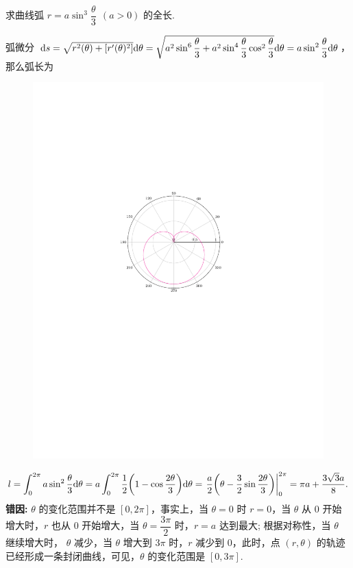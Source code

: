 \begin{example}
    求曲线弧 $r=a\sin^3\dfrac{\theta}{3}~~(a>0)$ 的全长.
\end{example}
\begin{errorSolution}
    弧微分 $\dd s=\sqrt{r^2(\theta)+\qty[r'(\theta)^2]}\dd \theta=\sqrt{a^2\sin^6\dfrac{\theta}{3}+a^2\sin^4\dfrac{\theta}{3}\cos^2\dfrac{\theta}{3}}\dd \theta=a\sin^2\dfrac{\theta}{3}\dd \theta$，那么弧长为\\
    \begin{minipage}{0.24\linewidth}
        \begin{figure}[H]
            \centering
            \includegraphics[scale=0.4]{figures/sin3 3pi.pdf}
            \caption{}
        \end{figure}
    \end{minipage}\hfill
    \begin{minipage}{0.75\linewidth}
        $$l=\int_{0}^{2\pi}a\sin^2\dfrac{\theta}{3}\dd \theta=a\int_{0}^{2\pi}\dfrac{1}{2}\qty(1-\cos\dfrac{2\theta}{3})\dd \theta=\eval{\dfrac{a}{2}\qty(\theta-\dfrac{3}{2}\sin\dfrac{2\theta}{3})}_{0}^{2\pi}=\pi a+\dfrac{3\sqrt{3}a}{8}.$$
        \textbf{错因: }$\theta$ 的变化范围并不是 $[0,2\pi]$，事实上，当 $\theta=0$ 时 $r=0$，当 $\theta$ 从 0 开始增大时，$r$ 也从 $0$ 开始增大，当 $\theta=\dfrac{3\pi}{2}$ 时，$r=a$ 达到最大; 根据对称性，当 $\theta$ 继续增大时， $\theta$ 减少，当 $\theta$ 增大到 $3\pi$ 时，$r$ 减少到 0，此时，点 $(r,\theta)$ 的轨迹已经形成一条封闭曲线，可见，$\theta$ 的变化范围是 $[0,3\pi]$.
    \end{minipage}
\end{errorSolution}
